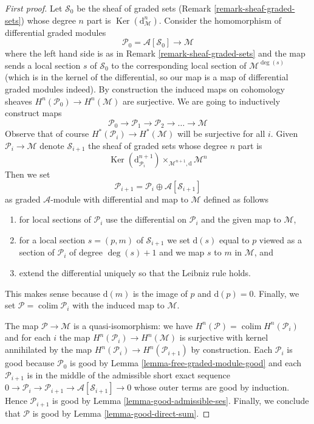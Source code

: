 \documentclass[10pt,a4paper]{amsart}
\theoremstyle{plain}
\theoremstyle{definition}
\theoremstyle{remark}
\numberwithin{equation}{subsection}
\def\colim{\mathop{\mathrm{colim}}\nolimits}
\def\Ker{\mathop{\mathrm{Ker}}}
\begin{document}
\begin{proof}[First proof]
Let $\mathcal{S}_0$ be the sheaf of graded sets
(Remark \ref{remark-sheaf-graded-sets})
whose degree $n$ part is $\Ker(\text{d}_\mathcal{M}^n)$.
Consider the homomorphism of differential graded modules
$$
\mathcal{P}_0 = \mathcal{A}[\mathcal{S}_0] \longrightarrow \mathcal{M}
$$
where the left hand side is as in Remark \ref{remark-sheaf-graded-sets}
and the map sends a local section $s$ of $\mathcal{S}_0$
to the corresponding local section of $\mathcal{M}^{\deg(s)}$
(which is in the kernel of the differential, so our map is
a map of differential graded modules indeed). By construction the
induced maps on cohomology sheaves $H^n(\mathcal{P}_0) \to H^n(\mathcal{M})$
are surjective. We are going to inductively construct maps
$$
\mathcal{P}_0 \to \mathcal{P}_1 \to \mathcal{P}_2 \to \ldots \to \mathcal{M}
$$
Observe that of course $H^*(\mathcal{P}_i) \to H^*(\mathcal{M})$
will be surjective for all $i$.
Given $\mathcal{P}_i \to \mathcal{M}$ denote $\mathcal{S}_{i + 1}$
the sheaf of graded sets whose degree $n$ part is
$$
\Ker(\text{d}_{\mathcal{P}_i}^{n + 1})
\times_{\mathcal{M}^{n + 1}, \text{d}}
\mathcal{M}^n
$$
Then we set
$$
\mathcal{P}_{i + 1} = \mathcal{P}_i \oplus \mathcal{A}[\mathcal{S}_{i + 1}]
$$
as graded $\mathcal{A}$-module with differential and map to
$\mathcal{M}$ defined as follows
\begin{enumerate}
\item for local sections of $\mathcal{P}_i$ use the differential on
$\mathcal{P}_i$ and the given map to $\mathcal{M}$,
\item for a local section $s = (p, m)$ of $\mathcal{S}_{i + 1}$ we set
$\text{d}(s)$ equal to $p$ viewed as a section of $\mathcal{P}_i$
of degree $\deg(s) + 1$ and we map $s$ to $m$ in $\mathcal{M}$, and
\item extend the differential uniquely so that the Leibniz rule holds.
\end{enumerate}
This makes sense because $\text{d}(m)$ is the image of $p$ and
$\text{d}(p) = 0$.
Finally, we set $\mathcal{P} = \colim \mathcal{P}_i$ with the
induced map to $\mathcal{M}$.

\medskip\noindent
The map $\mathcal{P} \to \mathcal{M}$ is a quasi-isomorphism:
we have $H^n(\mathcal{P}) = \colim H^n(\mathcal{P}_i)$
and for each $i$ the map $H^n(\mathcal{P}_i) \to H^n(\mathcal{M})$
is surjective with kernel annihilated  by the map
$H^n(\mathcal{P}_i) \to H^n(\mathcal{P}_{i + 1})$ by construction.
Each $\mathcal{P}_i$ is good because $\mathcal{P}_0$ is good
by Lemma \ref{lemma-free-graded-module-good} and each $\mathcal{P}_{i + 1}$
is in the middle of the admissible short exact sequence
$0 \to \mathcal{P}_i \to \mathcal{P}_{i + 1} \to
\mathcal{A}[\mathcal{S}_{i + 1}] \to 0$
whose outer terms are good by induction. Hence
$\mathcal{P}_{i + 1}$ is good by
Lemma \ref{lemma-good-admissible-ses}.
Finally, we conclude that $\mathcal{P}$ is good by
Lemma \ref{lemma-good-direct-sum}.
\end{proof}
\end{document}
